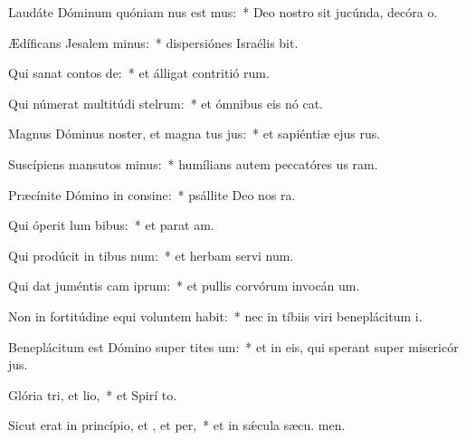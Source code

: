 \item Laudáte Dóminum quóniam nus est mus:~* Deo nostro sit jucúnda, decóra o.
\item Ædíficans Jesalem minus:~* dispersiónes Israélis bit.
\item Qui sanat contos de:~* et álligat contritió rum.
\item Qui númerat multitúdi stelrum:~* et ómnibus eis nó cat.
\item Magnus Dóminus noster, et magna tus jus:~* et sapiéntiæ ejus   rus.
\item Suscípiens mansutos minus:~* humílians autem peccatóres us  ram.
\item Præcínite Dómino in consine:~* psállite Deo nos  ra.
\item Qui óperit lum bibus:~* et parat  am.
\item Qui prodúcit in tibus num:~* et herbam servi num.
\item Qui dat juméntis cam iprum:~* et pullis corvórum invocán um.
\item Non in fortitúdine equi voluntem habit:~* nec in tíbiis viri beneplácitum  i.
\item Beneplácitum est Dómino super tites um:~* et in eis, qui sperant super misericór jus.
\item Glória tri, et lio,~* et Spirí to.
\item Sicut erat in princípio, et , et per,~* et in sǽcula sæcu. men.

